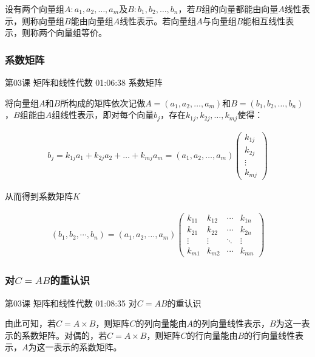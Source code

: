 \documentclass[UTF8]{ctexart}
\begin{document}
设有两个向量组$A:a_{1},a_{2},\dots,a_{m}$及$B:b_{1},b_{2},\dots,b_{n}$，若$B$组的向量都能由向量$A$线性表示，则称向量组$B$能由向量组$A$线性表示。若向量组$A$与向量组$B$能相互线性表示，则称两个向量组等价。

\subsubsection{系数矩阵}

第03课 矩阵和线性代数 01:06:38 系数矩阵

将向量组$A$和$B$所构成的矩阵依次记做$A=(a_{1},a_{2},\dots,a_{m})$和$B=(b_{1},b_{2},\dots,b_{n})$，$B$组能由$A$组线性表示，即对每个向量$b_{j}$，存在$k_{1j},k_{2j},\dots,k_{mj}$使得：

\begin{equation}
\begin{aligned}
b_{j}=k_{1j}a_{1}+k_{2j}a_{2}+\dots+k_{mj}a_{m}
=(a_{1},a_{2},\dots,a_{m}) \begin{pmatrix} k_{1j} \\ k_{2j} \\ \vdots \\ k_{mj} \end{pmatrix}
\end{aligned}
\end{equation}

从而得到系数矩阵$K$

\begin{equation}
\begin{aligned}
(b_{1},b_{2},\cdots,b_{n})
=(a_{1},a_{2},\dots,a_{m})
\begin{pmatrix}
k_{11} & k_{12} & \cdots & k_{1n} \\
k_{21} & k_{22} & \cdots & k_{2n} \\
\vdots & \vdots & \ddots & \vdots \\
k_{m1} & k_{m2} & \cdots & k_{mn}
\end{pmatrix}
\end{aligned}
\end{equation}

\subsubsection{对$C=AB$的重认识}

第03课 矩阵和线性代数 01:08:35 对$C=AB$的重认识

由此可知，若$C=A \times B$，则矩阵$C$的列向量能由$A$的列向量线性表示，$B$为这一表示的系数矩阵。对偶的，若$C=A \times B$，则矩阵$C$的行向量能由$B$的行向量线性表示，$A$为这一表示的系数矩阵。
\end{document}
